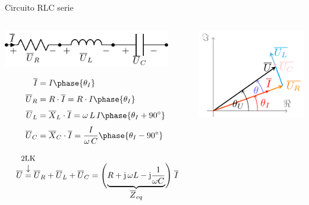 \documentclass[aspectratio=169, usenames,svgnames,dvipsnames]{beamer}
\begin{document}
\begin{frame}{Circuito RLC serie}
    \vspace{1mm}
    \begin{columns}
    \begin{column}{0.6\columnwidth}
    
        \vspace{1mm}
        \begin{center}
            \hspace*{5mm}\includegraphics[width=0.9\textwidth]{../figs/RLC.pdf}
        \end{center}

        \vspace{-8mm}
        \begin{align*}
            \overline{I} &=I\phase{\theta_I}\\[3pt]
            \overline{U}_R &= R \cdot \overline{I}=R\cdot I\phase{\theta_I}\\[3pt]
        	\overline{U}_L &=\overline{X}_L\cdot\overline{I}= \omega\,L\,I\phase{\theta_I+\ang{90}}\\[3pt]
            \overline{U}_C &= \overline{X}_C\cdot\overline{I}= \dfrac{I}{\omega\,C}\phase{\theta_I\ang{-90}}
        \end{align*}

        \vspace{-7mm}
        \begin{equation*}
            \;\; \overline{U} \overarrow[=][\downarrow]{\small 2LK}             
            \overline{U}_R + \overline{U}_L + \overline{U}_C = 
            \Biggl( \underbrace{ R + \mathrm{j}\,\omega L - \mathrm{j} \frac{1}{\omega C} }_{\textstyle \overline{Z}_{eq}} \Biggl) \; \overline{I}
        \end{equation*}
    \end{column}    
        
    \begin{column}{0.4\columnwidth}

    \vspace{8mm}    
        \begin{center}
        \includegraphics[height=0.55\textheight]{../figs/fasorRLC_VI.pdf}
        \end{center}
        

\end{column}
\end{columns}
\end{frame}
\end{document}
